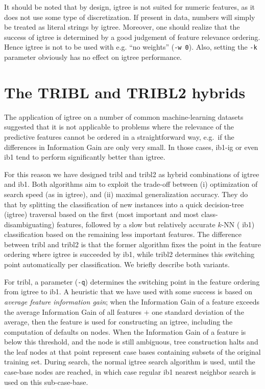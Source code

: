 \documentclass{report}
\begin{document}
It should be noted that by design, {\sc igtree} is not suited for
numeric features, as it does not use some type of discretization. If
present in data, numbers will simply be treated as literal strings by
{\sc igtree}. Moreover, one should realize that the success of {\sc
  igtree} is determined by a good judgement of feature relevance
ordering. Hence {\sc igtree} is not to be used with e.g. ``no
weights'' ({\tt -w 0}). Also, setting the {\tt -k} parameter obviously
has no effect on {\sc igtree} performance.

\section{The TRIBL and TRIBL2 hybrids}
\label{tribl}

The application of {\sc igtree} on a number of common machine-learning
datasets suggested that it is not applicable to problems where the
relevance of the predictive features cannot be ordered in a
straightforward way, e.g.~if the differences in Information Gain are
only very small. In those cases, {\sc ib1-ig} or even {\sc ib1} tend
to perform significantly better than {\sc igtree}.

For this reason we have designed {\sc tribl} \cite{Daelemans+97d} and
{\sc tribl2} as hybrid combinations of {\sc igtree} and {\sc
ib1}. Both algorithms aim to exploit the trade-off between (i)
optimization of search speed (as in {\sc igtree}), and (ii) maximal
generalization accuracy. They do that by splitting the classification
of new instances into a quick decision-tree ({\sc igtree}) traversal
based on the first (most important and most class-disambiguating)
features, followed by a slow but relatively accurate $k$-NN ({\sc
ib1}) classification based on the remaining less important
features. The difference between {\sc tribl} and {\sc tribl2} is that
the former algorithm fixes the point in the feature ordering where
{\sc igtree} is succeeded by {\sc ib1}, while {\sc tribl2} determines
this switching point automatically per classification. We briefly
describe both variants.

For {\sc tribl}, a parameter ({\tt -q}) determines the switching point
in the feature ordering from {\sc igtree} to {\sc ib1}. A heuristic
that we have used with some success is based on {\em average feature
information gain}; when the Information Gain of a feature exceeds the
average Information Gain of all features $+$ one standard
deviation of the average, then the feature is used for constructing an
{\sc igtree}, including the computation of defaults on nodes. When the
Information Gain of a feature is below this threshold, and the node is
still ambiguous, tree construction halts and the leaf nodes at that
point represent case bases containing subsets of the original training
set. During search, the normal {\sc igtree} search algorithm is used,
until the case-base nodes are reached, in which case regular {\sc ib1}
nearest neighbor search is used on this sub-case-base. 
\end{document}
